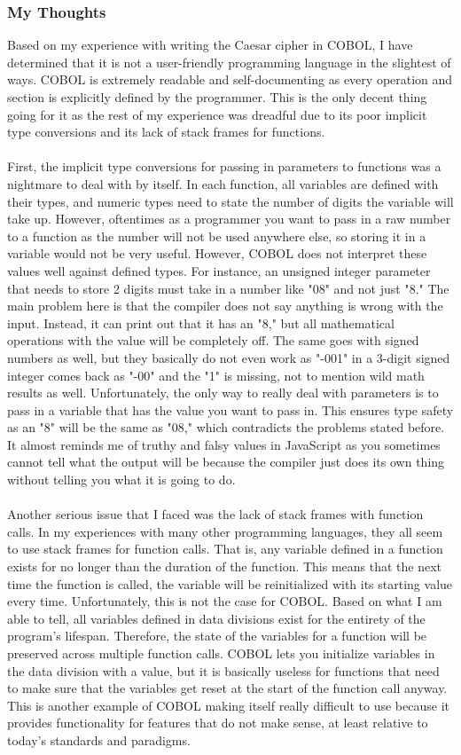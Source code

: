 \documentclass[letterpaper, 10pt, DIV=13]{scrartcl}
\numberwithin{equation}{section}
\numberwithin{figure}{section}
\numberwithin{table}{section}
\begin{document}
\subsubsection{My Thoughts}
Based on my experience with writing the Caesar cipher in COBOL, I have determined that it is not a user-friendly programming language in the slightest of ways. COBOL is extremely readable and self-documenting as every operation and section is explicitly defined by the programmer. This is the only decent thing going for it as the rest of my experience was dreadful due to its poor implicit type conversions and its lack of stack frames for functions.
\\ \\
First, the implicit type conversions for passing in parameters to functions was a nightmare to deal with by itself. In each function, all variables are defined with their types, and numeric types need to state the number of digits the variable will take up. However, oftentimes as a programmer you want to pass in a raw number to a function as the number will not be used anywhere else, so storing it in a variable would not be very useful. However, COBOL does not interpret these values well against defined types. For instance, an unsigned integer parameter that needs to store 2 digits must take in a number like "08" and not just "8." The main problem here is that the compiler does not say anything is wrong with the input. Instead, it can print out that it has an "8," but all mathematical operations with the value will be completely off. The same goes with signed numbers as well, but they basically do not even work as "-001" in a 3-digit signed integer comes back as "-00" and the "1" is missing, not to mention wild math results as well. Unfortunately, the only way to really deal with parameters is to pass in a variable that has the value you want to pass in. This ensures type safety as an "8" will be the same as "08," which contradicts the problems stated before. It almost reminds me of truthy and falsy values in JavaScript as you sometimes cannot tell what the output will be because the compiler just does its own thing without telling you what it is going to do.
\\ \\
Another serious issue that I faced was the lack of stack frames with function calls. In my experiences with many other programming languages, they all seem to use stack frames for function calls. That is, any variable defined in a function exists for no longer than the duration of the function. This means that the next time the function is called, the variable will be reinitialized with its starting value every time. Unfortunately, this is not the case for COBOL. Based on what I am able to tell, all variables defined in data divisions exist for the entirety of the program's lifespan. Therefore, the state of the variables for a function will be preserved across multiple function calls. COBOL lets you initialize variables in the data division with a value, but it is basically useless for functions that need to make sure that the variables get reset at the start of the function call anyway. This is another example of COBOL making itself really difficult to use because it provides functionality for features that do not make sense, at least relative to today's standards and paradigms.
\end{document}
